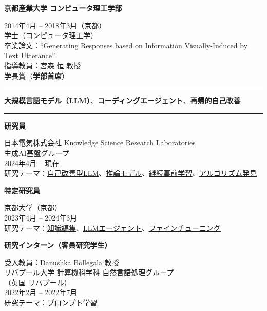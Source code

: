\documentclass[11pt,a4paper]{article}
\let\oldhref\href
\renewcommand{\href}[2]{\oldhref{#1}{\uline{#2}}}
\newlength{\labelcol}\setlength{\labelcol}{1.2in}
\newlength{\labelgap}\setlength{\labelgap}{0.21in}
\newcommand{\cvsection}[1]{%
  \par\vspace{26pt}%
  {\noindent\rule{\textwidth}{2.4pt}\par}\nopagebreak\vspace{9pt}%
  \noindent\llap{\smash[b]{\parbox[t]{\labelcol}{\raggedright\large\bfseries #1}}\hspace{\labelgap}}\ignorespaces}
\newcommand{\entry}[1]{\par\vspace{10pt}\noindent\textbf{#1}\par\nopagebreak}
\newcommand{\entryfirst}[1]{\textbf{#1}\par\nopagebreak}
\newenvironment{indented}{%
  \par\nopagebreak
  \begin{list}{}{\setlength{\leftmargin}{0.3in}\setlength{\topsep}{1pt}%
    \setlength{\partopsep}{0pt}\setlength{\itemsep}{0pt}\setlength{\parsep}{1pt}}\item[]}{\end{list}}
\begin{document}
\entry{京都産業大学 コンピュータ理工学部}
\begin{indented}
2014年4月 -- 2018年3月（京都）\\[3pt]
学士（コンピュータ理工学）\\[3pt]
卒業論文：``Generating Responses based on Information Visually-Induced by Text Utterance''\\[3pt]
指導教員：\href{https://researchmap.jp/read0006204}{宮森 恒} 教授\\
学長賞（\textbf{学部首席}）
\end{indented}

\cvsection{研究分野}%
\textbf{大規模言語モデル（LLM）}、\textbf{コーディングエージェント}、\textbf{再帰的自己改善}

\cvsection{職歴・\\研究歴}%
\entryfirst{研究員}
\begin{indented}
日本電気株式会社 Knowledge Science Research Laboratories\\
生成AI基盤グループ\\
2024年4月 -- 現在\\
研究テーマ：\href{https://arxiv.org/abs/2410.15639}{自己改善型LLM}、\href{https://arxiv.org/abs/2505.10182}{推論モデル}、\href{https://arxiv.org/abs/2505.10182}{継続事前学習}、\href{https://arxiv.org/abs/2605.15221}{アルゴリズム発見}
\end{indented}

\entry{特定研究員}
\begin{indented}
京都大学（京都）\\
2023年4月 -- 2024年3月\\
研究テーマ：\href{https://arxiv.org/abs/2309.11852}{知識編集}、\href{https://arxiv.org/abs/2404.02183}{LLMエージェント}、\href{https://arxiv.org/abs/2309.11852}{ファインチューニング}
\end{indented}

\entry{研究インターン（客員研究学生）}
\begin{indented}
受入教員：\href{https://danushka.net/}{Danushka Bollegala} 教授\\
リバプール大学 計算機科学科 自然言語処理グループ\\
（英国 リバプール）\\
2022年2月 -- 2022年7月\\
研究テーマ：\href{https://arxiv.org/abs/2302.05619}{プロンプト学習}
\end{indented}
\end{document}

